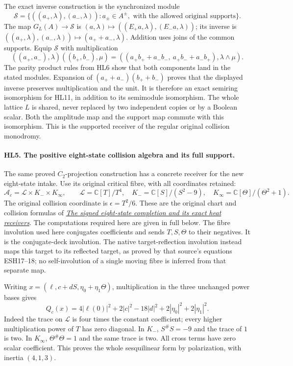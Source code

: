 \documentclass[11pt,a4paper]{article}
\theoremstyle{definition}\newtheorem{definition}[theorem]{Definition}
\begin{document}
The exact inverse construction is the synchronized module
\[
 \mathcal S=\{((a_+,\lambda),(a_-,\lambda)):
       a_\pm\in A^\pm,\text{ with the allowed original supports}\}.
 \tag{HL10}
\]
The map $G_L(A)\to\mathcal S$ is
$(a,\lambda)\mapsto((E_+a,\lambda),(E_-a,\lambda))$;
its inverse is $((a_+,\lambda),(a_-,\lambda))\mapsto
(a_++a_-,\lambda)$. Addition uses joins of the common supports.
Equip $\mathcal S$ with multiplication
\[
 ((a_+,a_-),\lambda)((b_+,b_-),\mu)
   =((a_+b_++a_-b_-,\ a_+b_-+a_-b_+),\lambda\wedge\mu).
 \tag{HL11}
\]
The parity product rules from HL6 show that both components land
in the stated modules. Expansion of $(a_++a_-)(b_++b_-)$ proves
that the displayed inverse preserves multiplication and the unit.
It is therefore an exact semiring isomorphism for HL11, in
addition to its semimodule isomorphism. The whole lattice $L$
is shared, never replaced by two independent copies or by a
Boolean scalar. Both the amplitude map and the support map commute
with this isomorphism. This is the supported receiver of the
regular original collision monodromy.

\paragraph{HL5. The positive eight-state collision algebra and its full support.}
The same proved $C_2$-projection construction has a concrete receiver
for the new eight-state intake. Use its original critical fibre,
with all coordinates retained:
\[
 \mathcal A_c=\mathcal L\times K_-\times K_\infty,\qquad
 \mathcal L=\mathbb C[T]/T^4,\quad
 K_-=\mathbb C[S]/(S^2-9),\quad
 K_\infty=\mathbb C[\Theta]/(\Theta^2+1).
 \tag{HL12}
\]
The original collision coordinate is $\epsilon=T^2/6$.
These are the original chart and collision formulas of
\href{https://github.com/KokunoYumeto/zeta-function-research-reader/blob/64a77de144720ea9e07943d6ed6f63a178d462cf/workbenches/splitzero-tandem/branches/tau-zero-prime-positivity/EIGHT_STATE_HEAT_COMPARISON.md}{\emph{The signed eight-state completion and its exact heat receivers}}.
The computations required here are given in full below.
The fibre involution used here conjugates coefficients and sends
$T,S,\Theta$ to their negatives. It is the conjugate-deck involution.
The native target-reflection involution instead maps this target
to its reflected target, as proved by that source's equations
ESH17--18; no self-involution of a single moving fibre is inferred
from that separate map.

Writing $x=(\ell,c+dS,\eta_0+\eta_1\Theta)$, multiplication
in the three unchanged power bases gives
\[
 Q_c(x)=4|\ell(0)|^2+2|c|^2-18|d|^2
                         +2|\eta_0|^2+2|\eta_1|^2.
 \tag{HL13}
\]
Indeed the trace on $\mathcal L$ is four times the constant
coefficient; every higher multiplication power of $T$ has zero
diagonal. In $K_-$, $S^\#S=-9$ and the trace of $1$ is two.
In $K_\infty$, $\Theta^\#\Theta=1$ and the same trace is two.
All cross terms have zero scalar coefficient. This proves the
whole sesquilinear form by polarization, with inertia $(4,1,3)$.
\end{document}
